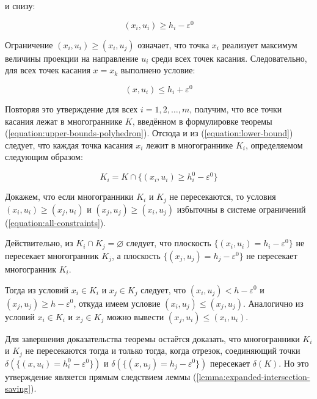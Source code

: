 \documentclass[a4paper, 10pt]{article}
\theoremstyle{definition}
\theoremstyle{plain}
\theoremstyle{plain}
\begin{document}
и снизу:

\begin{equation}
\label{equation:lower-bound}
 (x_{i}, u_{i}) \geq h_{i} - \varepsilon^{0}
\end{equation}

Ограничение $(x_{i}, u_{i}) \geq (x_{i}, u_{j})$ означает, что точка $x_{i}$
реализует максимум величины проекции на направление $u_{i}$ среди всех точек
касания. Следовательно, для всех точек касания $x = x_{k}$ выполнено условие:

\begin{equation*}
 (x, u_{i}) \leq h_{i} + \varepsilon^{0}
\end{equation*}

Повторяя это утверждение для всех $i = 1, 2, \ldots, m$, получим, что все точки
касания лежат в многограннике $K$, введённом в формулировке теоремы
(\ref{equation:upper-bounds-polyhedron}). Отсюда и из
(\ref{equation:lower-bound}) следует, что каждая точка касания $x_{i}$ лежит
в многограннике $K_{i}$, определяемом следующим образом:

\begin{equation*}
 K_{i} = K \cap \{(x_{i}, u_{i}) \geq h^{0}_{i} - \varepsilon^{0}\}
\end{equation*}

Докажем, что если многогранники $K_{i}$ и $K_{j}$ не пересекаются, то условия
$(x_{i}, u_{i}) \geq (x_{j}, u_{i})$ и $(x_{j}, u_{j}) \geq (x_{i}, u_{j})$
избыточны в системе ограничений (\ref{equation:all-constraints}).

Действительно, из $K_{i} \cap K_{j} = \varnothing$ следует, что плоскость
$\{(x_{i}, u_{i}) = h_{i} - \varepsilon^{0}\}$ не пересекает многогранник
$K_{j}$, а плоскость $\{(x_{j}, u_{j}) = h_{j} - \varepsilon^{0}\}$ не
пересекает многогранник $K_{i}$.

Тогда из условий $x_{i} \in K_{i}$ и $x_{j} \in K_{j}$ следует, что
$(x_{i}, u_{j}) < h - \varepsilon^{0}$ и
$(x_{j}, u_{j}) \geq h - \varepsilon^{0}$, откуда имеем условие
$(x_{i}, u_{j}) \leq (x_{j}, u_{j})$. Аналогично из условий $x_{i} \in K_{i}$ и
$x_{j} \in K_{j}$ можно вывести $(x_{j}, u_{i}) \leq (x_{i}, u_{i})$.

Для завершения доказательства теоремы остаётся доказать, что многогранники
$K_{i}$ и $K_{j}$ не пересекаются тогда и только тогда, когда отрезок,
соединяющий точки $\delta(\{(x, u_{i}) = h^{0}_{i} - \varepsilon^{0}\})$ и
$\delta(\{(x, u_{j}) = h_{j} - \varepsilon^{0}\})$ пересекает $\delta(K)$.
Но это утверждение является прямым следствием леммы
(\ref{lemma:expanded-intersection-saving}).
\end{document}
